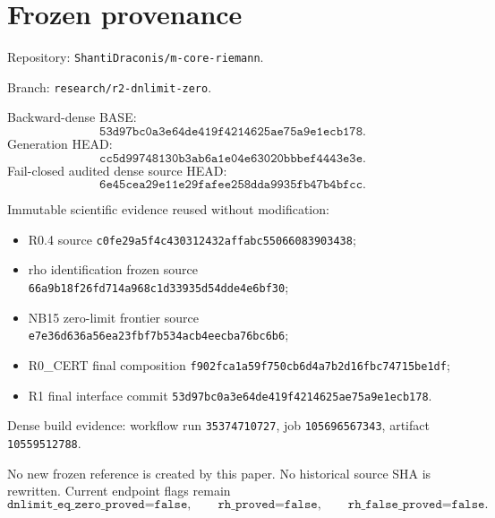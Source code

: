 \appendix
\section{Frozen provenance}
Repository: \texttt{ShantiDraconis/m-core-riemann}.

Branch: \texttt{research/r2-dnlimit-zero}.

Backward-dense BASE:
\[\texttt{53d97bc0a3e64de419f4214625ae75a9e1ecb178}.\]
Generation HEAD:
\[\texttt{cc5d99748130b3ab6a1e04e63020bbbef4443e3e}.\]
Fail-closed audited dense source HEAD:
\[\texttt{6e45cea29e11e29fafee258dda9935fb47b4bfcc}.\]

Immutable scientific evidence reused without modification:
\begin{itemize}
\item R0.4 source \texttt{c0fe29a5f4c430312432affabc55066083903438};
\item rho identification frozen source \texttt{66a9b18f26fd714a968c1d33935d54dde4e6bf30};
\item NB15 zero-limit frontier source \texttt{e7e36d636a56ea23fbf7b534acb4eecba76bc6b6};
\item R0\_CERT final composition \texttt{f902fca1a59f750cb6d4a7b2d16fbc74715be1df};
\item R1 final interface commit \texttt{53d97bc0a3e64de419f4214625ae75a9e1ecb178}.
\end{itemize}

Dense build evidence: workflow run \texttt{35374710727}, job \texttt{105696567343}, artifact \texttt{10559512788}.

No new frozen reference is created by this paper. No historical source SHA is rewritten. Current endpoint flags remain
\[
\texttt{dnlimit\_eq\_zero\_proved=false},\qquad
\texttt{rh\_proved=false},\qquad
\texttt{rh\_false\_proved=false}.
\]